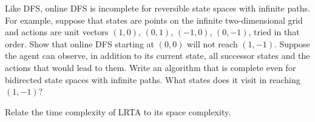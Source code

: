 \begin{uexercise}%
Like DFS, online DFS is incomplete for reversible state spaces with
infinite paths.  For example, suppose that states are points on the infinite
two-dimensional grid and actions are unit vectors \((1,0)\), \((0,1)\), \((-1,0)\), \((0,-1)\), tried in that order. Show that
online DFS starting at \((0,0)\) will not reach \((1,-1)\).  Suppose the
agent can observe, in addition to its current state, all successor
states and the actions that would lead to them.  Write an algorithm
that is complete even for bidirected state spaces with infinite paths.
What states does it visit in reaching \((1,-1)\)?
\end{uexercise} 

\begin{iexercise}
Relate the time complexity of LRTA{\star} to its space complexity.
\end{iexercise} 









